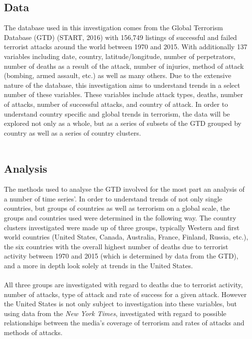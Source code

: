 \documentclass[10pt,a4paper]{article}
\begin{document}
\subsection{Data}
The database used in this investigation comes from the Global Terrorism Database (GTD) (START, 2016) with 156,749 listings of successful and failed terrorist attacks around the world between 1970 and 2015. With additionally 137 variables including date, country, latitude/longitude, number of perpetrators, number of deaths as a result of the attack, number of injuries, method of attack (bombing, armed assault, etc.) as well as many others. Due to the extensive nature of the database, this investigation aims to understand trends in a select number of these variables. These variables include attack types, deaths, number of attacks, number of successful attacks, and country of attack. In order to understand country specific and global trends in terrorism, the data will be explored not only as a whole, but as a series of subsets of the GTD grouped by country as well as a series of country clusters.
\\\\

\subsection{Analysis}
The methods used to analyse the GTD involved for the most part an analysis of a number of time series'. In order to understand trends of not only single countries, but groups of countries as well as terrorism on a global scale, the groups and countries used were determined in the following way. The country clusters investigated were made up of three groups, typically Western and first world countries (United States, Canada, Australia, France, Finland, Russia, etc.), the six countries with the overall highest number of deaths due to terrorist activity between 1970 and 2015 (which is determined by data from the GTD), and a more in depth look solely at trends in the United States.
\\\\
All three groups are investigated with regard to deaths due to terrorist activity, number of attacks, type of attack and rate of success for a given attack. However the United States is not only subject to investigation into these variables, but using data from the \textit{New York Times}, investigated with regard to possible relationships between the media's coverage of terrorism and rates of attacks and methods of attacks.
\end{document}
